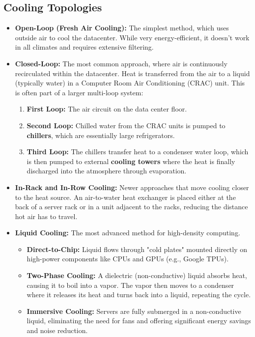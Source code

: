 \subsection{Cooling Topologies}
\begin{itemize}
    \item \textbf{Open-Loop (Fresh Air Cooling):} The simplest method, which uses outside air to cool the datacenter. While very energy-efficient, it doesn't work in all climates and requires extensive filtering.
    \item \textbf{Closed-Loop:} The most common approach, where air is continuously recirculated within the datacenter. Heat is transferred from the air to a liquid (typically water) in a Computer Room Air Conditioning (CRAC) unit. This is often part of a larger multi-loop system:
    \begin{enumerate}
        \item \textbf{First Loop:} The air circuit on the data center floor.
        \item \textbf{Second Loop:} Chilled water from the CRAC units is pumped to \textbf{chillers}, which are essentially large refrigerators.
        \item \textbf{Third Loop:} The chillers transfer heat to a condenser water loop, which is then pumped to external \textbf{cooling towers} where the heat is finally discharged into the atmosphere through evaporation.
    \end{enumerate}
    \item \textbf{In-Rack and In-Row Cooling:} Newer approaches that move cooling closer to the heat source. An air-to-water heat exchanger is placed either at the back of a server rack or in a unit adjacent to the racks, reducing the distance hot air has to travel.
    \item \textbf{Liquid Cooling:} The most advanced method for high-density computing.
    \begin{itemize}
        \item \textbf{Direct-to-Chip:} Liquid flows through "cold plates" mounted directly on high-power components like CPUs and GPUs (e.g., Google TPUs).
        \item \textbf{Two-Phase Cooling:} A dielectric (non-conductive) liquid absorbs heat, causing it to boil into a vapor. The vapor then moves to a condenser where it releases its heat and turns back into a liquid, repeating the cycle.
        \item \textbf{Immersive Cooling:} Servers are fully submerged in a non-conductive liquid, eliminating the need for fans and offering significant energy savings and noise reduction.
    \end{itemize}
\end{itemize}

